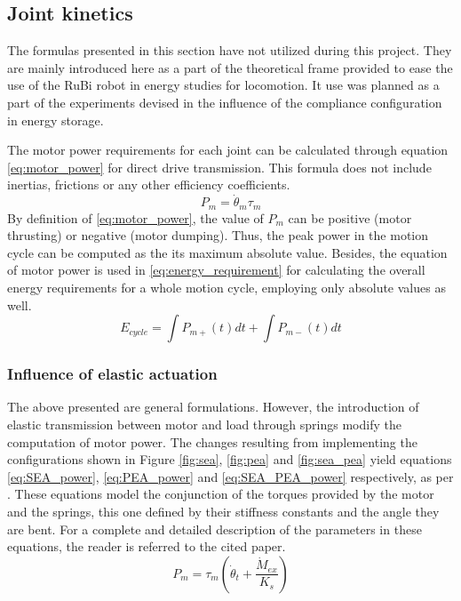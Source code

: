 \subsection{Joint kinetics} %
\label{sec:joint_kinetics}
The formulas presented in this section have not utilized during this project. 
They are mainly introduced here as a part of the theoretical frame provided to ease the use of the RuBi robot in energy studies for locomotion.
It use was planned as a part of the experiments devised in the influence of the compliance configuration in energy storage.

The motor power requirements for each joint can be calculated through equation \ref{eq:motor_power} for direct drive transmission.
This formula does not include inertias, frictions or any other efficiency coefficients. 
\begin{equation}
\label{eq:motor_power}
	P_{m} = \dot{\theta}_{m} \tau_{m}
\end{equation}
By definition of \ref{eq:motor_power}, the value of $P_{m}$ can be positive (motor thrusting) or negative (motor dumping).
Thus, the peak power in the motion cycle can be computed as the its maximum absolute value.
Besides, the equation of motor power is used in \ref{eq:energy_requirement} for calculating the overall energy requirements for a whole motion cycle, employing only absolute values as well.
\begin{equation}
\label{eq:energy_requirement}
 	E_{cycle} = \int{P_{m+}(t) dt} + \int{P_{m-}(t) dt}
 \end{equation} 

\subsubsection{Influence of elastic actuation} %
\label{sub:influence_of_elastic_actuation}
The above presented are general formulations.
However, the introduction of elastic transmission between motor and load through springs modify the computation of motor power.
The changes resulting from implementing the configurations shown in Figure \ref{fig:sea}, \ref{fig:pea} and \ref{fig:sea_pea} yield equations \ref{eq:SEA_power}, \ref{eq:PEA_power} and \ref{eq:SEA_PEA_power} respectively, as per \cite{grimmer}.
These equations model the conjunction of the torques provided by the motor and the springs, this one defined by their stiffness constants and the angle they are bent.
For a complete and detailed description of the parameters in these equations, the reader is referred to the cited paper.
\begin{equation}
\label{eq:SEA_power}
	P_{m} = \tau_{m} \left(\dot{\theta}_{t} + \frac{\dot{M}_{ex}}{K_{s}}\right)
\end{equation}

